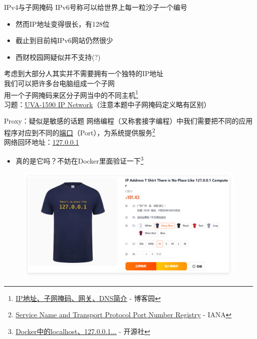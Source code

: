 \documentclass[aspectratio=1610]{beamer}
\begin{document}
\begin{frame}[t]{IPv4与子网掩码}
    IPv6号称可以给世界上每一粒沙子一个编号
    \begin{center}
        \begin{itemize}
            \item 然而IP地址变得很长，有128位
            \item 截止到目前纯IPv6网站仍然很少
            \item 西财校园网疑似并不支持(?)
        \end{itemize}
    \end{center}

    考虑到大部分人其实并不需要拥有一个独特的IP地址 \\
    我们可以把许多台电脑组成一个子网 \\
    用一个子网掩码来区分子网当中的不同主机\footnote{\href{https://www.cnblogs.com/tiandi/p/16320212.html}{IP地址、子网掩码、网关、DNS简介} - 博客园} \\[1em]

    习题：\href{https://onlinejudge.org/index.php?option=com_onlinejudge&Itemid=8&page=show_problem&problem=4465}{UVA-1590 IP Network}（注意本题中子网掩码定义略有区别）
\end{frame}

\begin{frame}{Proxy：疑似是敏感的话题}
    网络编程（又称套接字编程）中我们需要把不同的应用程序对应到不同的\href{https://gnu-linux.readthedocs.io/zh/latest/Chapter03/00_port.html}{\alert{端口}}（Port），为系统提供服务\footnote{\href{https://www.iana.org/assignments/service-names-port-numbers/service-names-port-numbers.xhtml}{Service Name and Transport Protocol Port Number Registry} - IANA}\\[0.5em]
    网络回环地址：\href{http://127.0.0.1/}{127.0.0.1}
    \begin{center}
        \begin{itemize}
            \item 真的是它吗？不妨在Docker里面验证一下\footnote{\href{https://kaiyuanshe.feishu.cn/wiki/AUANwul81iwbVSkrzqRcJzVlnAv}{Docker中的localhost、127.0.0.1...} - 开源社}
        \end{itemize}
    \end{center}

    \begin{figure}[htpb]
        \centering
        \includegraphics[height=0.5\textheight]{pic/Tshirt.png}
    \end{figure}
\end{frame}
\end{document}
